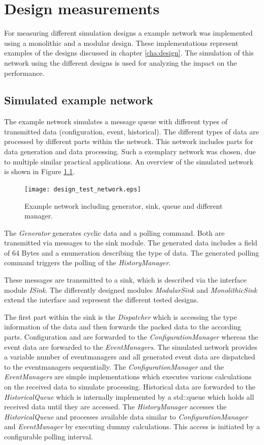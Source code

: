 \chapter{Design measurements}
\label{cha:measurements}
For measuring different simulation designs a example network was implemented using a monolithic and a modular design.
These implementations represent examples of the designs discussed in chapter \ref{cha:design}.
The simulation of this network using the different designs is used for analyzing the impact on the performance.


\section{Simulated example network}
\label{sec:measurements_network}
The example network simulates a message queue with different types of transmitted data (configuration, event, historical).
The different types of data are processed by different parts within the network.
This network includes parts for data generation and data processing.
Such a exemplary network was chosen, due to multiple similar practical applications.
An overview of the simulated network is shown in Figure \ref{fig:design_test_network}.

\begin{figure}
    \centering
    \texttt{[image: design\_test\_network.eps]}
    \caption{Example network including generator, sink, queue and different manager.}
    \label{fig:design_test_network}
\end{figure}

The \emph{Generator} generates cyclic data and a polling command.
Both are transmitted via messages to the sink module.
The generated data includes a field of 64 Bytes and a enumeration describing the type of data.
The generated polling command triggers the polling of the \emph{HistoryManager}.

These messages are transmitted to a sink, which is described via the interface module \emph{ISink}.
The differently designed modules \emph{ModularSink} and \emph{MonolithicSink} extend the interface and represent the different tested designs.

The first part within the sink is the \emph{Dispatcher} which is accessing the type information of the data and then forwards the packed data to the according parts.
Configuration and are forwarded to the \emph{ConfigurationManager} whereas the event data are forwarded to the \emph{EventManagers}.
The simulated network provides a variable number of eventmanagers and all generated event data are dispatched to the eventmanagers sequentially.
The \emph{ConfigurationManager} and the \emph{EventManagers} are simple implementations which executes various calculations on the received data to simulate processing.
Historical data are forwarded to the \emph{HistoricalQueue} which is internally implemented by a std::queue which holds all received data until they are accessed.
The \emph{HistoryManager} accesses the \emph{HistoricalQueue} and processes available data similar to \emph{ConfigurationManager} and \emph{EventManager} by executing dummy calculations.
This access is initiated by a configurable polling interval.
\\

